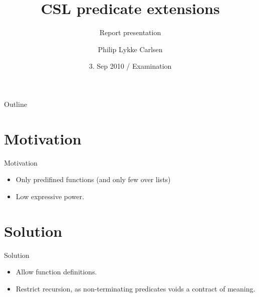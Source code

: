 \documentclass{beamer}
\title %
{CSL predicate extensions}
\subtitle
{Report presentation} %
\author %
{Philip Lykke Carlsen}
\date[Exam] %
{ 3. Sep 2010 / Examination}
\begin{document}
\begin{frame}
  \titlepage
\end{frame}

\begin{frame}{Outline}
  \tableofcontents
\end{frame}




\section{Motivation}


\begin{frame}{Motivation}

  \begin{itemize}
  \item
    Only predifined functions (and only few over lists)
  \item
    Low expressive power.
  \end{itemize}
\end{frame}

\section{Solution}

\begin{frame}{Solution}

  \begin{itemize}
    \item Allow function definitions.
    \item \alert{Restrict recursion}, as non-terminating predicates voids a contract of meaning.
  \end{itemize}

\end{frame}
\end{document}
